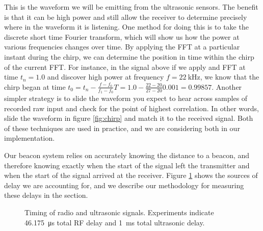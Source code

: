 \documentclass{article}
\newcommand{\cmmnt}[1]{\ignorespaces}
\begin{document}
        This is the waveform we will be emitting from the ultrasonic sensors. The benefit is that it can be high power and still allow the receiver to determine precisely where in the waveform it is listening. One method for doing this is to take the discrete short time Fourier transform, which will show us how the power at various frequencies changes over time. By applying the FFT at a particular instant during the chirp, we can determine the position in time within the chirp of the current FFT. For instance, in the signal above if we apply and FFT at time $t_n=1.0$ and discover high power at frequency $f=\SI{22}{\kilo\hertz}$, we know that the chirp began at time $t_0 = t_n - \tfrac{f - f_0}{f_1 - f_0}T = 1.0 - \tfrac{22-20}{27-20}0.001 = 0.99857$. Another simpler strategy is to slide the waveform you expect to hear across samples of recorded raw input and check for the point of highest correlation. In other words, slide the waveform in figure \ref{fig:chirp} and match it to the received signal. Both of these techniques are used in practice, and we are considering both in our implementation. \cmmnt{what are the pros and cons}

        Our beacon system relies on accurately knowing the distance to a beacon, and therefore knowing exactly when the start of the signal left the transmitter and when the start of the signal arrived at the receiver. Figure \ref{fig:rx_tx_timing} shows the sources of delay we are accounting for, and we describe our methodology for measuring these delays in the  section. \\

      \begin{figure}
        \centering
        \label{fig:rx_tx_timing}
        \caption{Timing of radio and ultrasonic signals. Experiments indicate \SI{46.175}{\micro\second} total RF delay and \SI{1}{\milli\second} total ultrasonic delay.}
      \end{figure}
\end{document}
